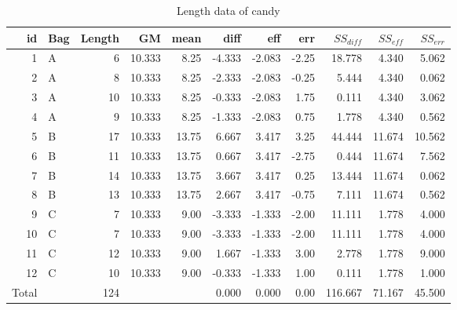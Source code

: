 \begin{table}[ht]
	\centering
	\caption{Length data of candy}
	\begin{tabular}[t]{rlrrrrrrrrr}
		id    & Bag & Length & GM     & mean  & diff   & eff    & err   & $SS_{diff}$ & $SS_{eff}$ & $SS_{err}$ \\\hline\hline
		1     & A   & 6      & 10.333 & 8.25  & -4.333 & -2.083 & -2.25 & 18.778      & 4.340      & 5.062      \\
		2     & A   & 8      & 10.333 & 8.25  & -2.333 & -2.083 & -0.25 & 5.444       & 4.340      & 0.062      \\
		3     & A   & 10     & 10.333 & 8.25  & -0.333 & -2.083 & 1.75  & 0.111       & 4.340      & 3.062      \\
		4     & A   & 9      & 10.333 & 8.25  & -1.333 & -2.083 & 0.75  & 1.778       & 4.340      & 0.562      \\
		5     & B   & 17     & 10.333 & 13.75 & 6.667  & 3.417  & 3.25  & 44.444      & 11.674     & 10.562     \\
		6     & B   & 11     & 10.333 & 13.75 & 0.667  & 3.417  & -2.75 & 0.444       & 11.674     & 7.562      \\
		7     & B   & 14     & 10.333 & 13.75 & 3.667  & 3.417  & 0.25  & 13.444      & 11.674     & 0.062      \\
		8     & B   & 13     & 10.333 & 13.75 & 2.667  & 3.417  & -0.75 & 7.111       & 11.674     & 0.562      \\
		9     & C   & 7      & 10.333 & 9.00  & -3.333 & -1.333 & -2.00 & 11.111      & 1.778      & 4.000      \\
		10    & C   & 7      & 10.333 & 9.00  & -3.333 & -1.333 & -2.00 & 11.111      & 1.778      & 4.000      \\
		11    & C   & 12     & 10.333 & 9.00  & 1.667  & -1.333 & 3.00  & 2.778       & 1.778      & 9.000      \\
		12    & C   & 10     & 10.333 & 9.00  & -0.333 & -1.333 & 1.00  & 0.111       & 1.778      & 1.000      \\\hline
		Total &     & 124    &        &       & 0.000  & 0.000  & 0.00  & 116.667     & 71.167     & 45.500     \\\hline
	\end{tabular}
	\label{anovaExample1}
\end{table}
